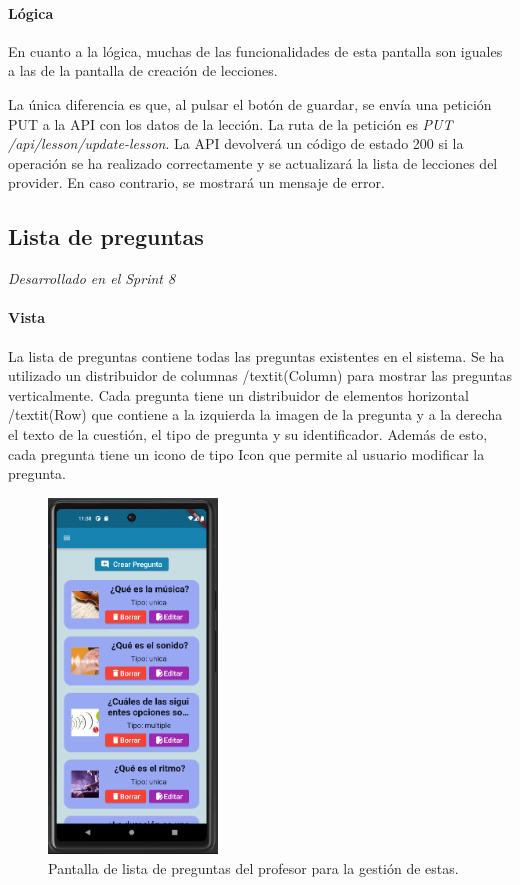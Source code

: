 \paragraph*{Lógica}
En cuanto a la lógica, muchas de las funcionalidades de esta pantalla son iguales a las de la pantalla de creación de lecciones.

La única diferencia es que, al pulsar el botón de guardar, se envía una petición PUT a la API con los datos de la lección. 
La ruta de la petición es \textit{PUT /api/lesson/update-lesson}. La API devolverá un código de estado 200 si la operación se 
ha realizado correctamente y se actualizará la lista de lecciones del provider. En caso contrario, se mostrará un mensaje de error.

\newpage
\subsection{Lista de preguntas} 

\textit{Desarrollado en el Sprint 8}

\paragraph*{Vista}
La lista de preguntas contiene todas las preguntas existentes en el sistema. Se ha utilizado un distribuidor de columnas /textit{(Column)} para mostrar las preguntas verticalmente. 
Cada pregunta tiene un distribuidor de elementos horizontal /textit{(Row)} que contiene a la izquierda la imagen de la pregunta y 
a la derecha el texto de la cuestión, el tipo de pregunta y su identificador. Además de esto, cada pregunta tiene un icono de tipo Icon que permite al usuario modificar la pregunta.
\begin{figure}[H]
  \centering
  \includegraphics[width=0.4\textwidth]{imagenes/c7/listapreguntas.png}
  \caption{Pantalla de lista de preguntas del profesor para la gestión de estas.} 
  \label{fig:listapreguntas}
\end{figure}

